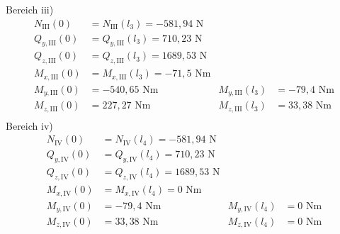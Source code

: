 Bereich iii)
\begin{align*}
	N_{\mathrm{III}} (0) &= N_{\mathrm{III}} (l_3) = -581,94 \text{ N}\\
	Q_{y,\mathrm{III}} (0) &= Q_{y,\mathrm{III}} (l_3) =710,23\text{ N}\\
	Q_{z,\mathrm{III}} (0) &= Q_{z,\mathrm{III}} (l_3) = 1689,53\text{ N}\\
	M_{x,\mathrm{III}} (0) &= M_{x,\mathrm{III}} (l_3) = -71,5\text{ Nm}\\
	M_{y,\mathrm{III}} (0) &=  -540,65\text{ Nm} & M_{y,\mathrm{III}} (l_3) &= -79,4\text{ Nm}\\
	M_{z,\mathrm{III}} (0) &= 227,27\text{ Nm} &M_{z,\mathrm{III}} (l_3) &= 33,38\text{ Nm}\\
\end{align*}
Bereich iv)
\begin{align*}
	N_{\mathrm{IV}} (0) &= N_{\mathrm{IV}} (l_4) = -581,94 \text{ N}\\
	Q_{y,\mathrm{IV}} (0) &= Q_{y,\mathrm{IV}} (l_4) = 710,23\text{ N}\\
	Q_{z,\mathrm{IV}} (0) &= Q_{z,\mathrm{IV}} (l_4) = 1689,53\text{ N}\\
	M_{x,\mathrm{IV}} (0) &= M_{x,\mathrm{IV}} (l_4) = 0\text{ Nm}\\
	M_{y,\mathrm{IV}} (0) &=  -79,4\text{ Nm} & M_{y,\mathrm{IV}} (l_4) &= 0\text{ Nm}\\
	M_{z,\mathrm{IV}} (0) &= 33,38\text{ Nm} &M_{z,\mathrm{IV}} (l_4) &= 0\text{ Nm}\\
\end{align*}
\newpage

